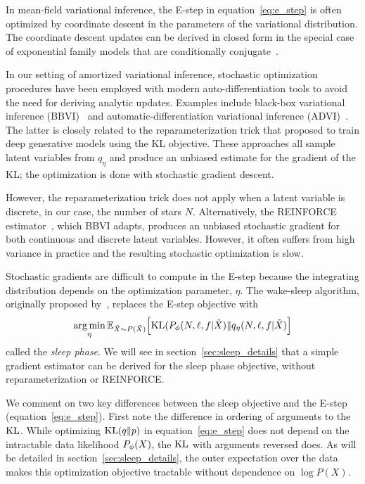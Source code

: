 In mean-field variational inference, the E-step in equation~\eqref{eq:e_step} is often optimized by coordinate descent in the parameters of the variational distribution. 
The coordinate descent updates can be derived in closed form in the special case of exponential family models that are conditionally conjugate~\cite{Blei_2017_vi_review}. 

In our setting of amortized variational inference, stochastic 
optimization procedures have been employed with modern 
auto-differentiation tools to avoid the need for deriving 
analytic updates. Examples include black-box variational inference (BBVI)~\cite{ranganath2013black} 
and automatic-differentiation variational inference (ADVI)~\cite{kucukelbir2016automatic}. The latter 
is closely related to the reparameterization trick that \cite{kingma2013autoencoding, rezende2014stochastic} proposed to train deep generative models using the KL objective. 
These approaches all sample latent variables from $q_\eta$ and produce an unbiased estimate 
for the gradient of the KL; the optimization is done with stochastic gradient descent. 

However, the reparameterization trick does not apply when a latent variable is discrete, in our case, the number of stars $N$. Alternatively, the REINFORCE estimator~\cite{Williams1992reinforce}, which BBVI adapts, produces an unbiased stochastic gradient for both continuous and discrete latent variables. However, it often suffers from high variance in practice and the resulting stochastic optimization is slow. 

Stochastic gradients are difficult to compute in the E-step because the integrating distribution depends on the optimization parameter, $\eta$. 
The wake-sleep algorithm, originally proposed by~\cite{Hinton1995wake_sleep}, replaces the 
E-step objective with 
\begin{align}
    \operatorname*{arg\,min}_{\eta} \mathbb{E}_{\tilde X \sim P(\tilde X)}\Big[\textrm{KL}(P_\phi(N, \ell, f | \tilde X) \| q_\eta(N, \ell, f | \tilde X)\Big]
    \label{eq:sleep_obj}
\end{align}
called the {\itshape sleep phase}. We will see in section~\ref{sec:sleep_details} that a simple gradient estimator can be derived for the sleep phase objective, without 
reparameterization or REINFORCE. 

We comment on two key differences between the sleep objective and the E-step (equation~\eqref{eq:e_step}). First note the difference in ordering of arguments to the $\textrm{KL}$. 
While optimizing $\textrm{KL}(q\|p)$ in equation~\eqref{eq:e_step} does not depend on the intractable 
data likelihood $P_\phi(X)$, the $\textrm{KL}$ with arguments reversed does. 
As will be detailed in section~\ref{sec:sleep_details}, the outer expectation over the data makes this optimization objective tractable without dependence on $\log P(X)$. 

